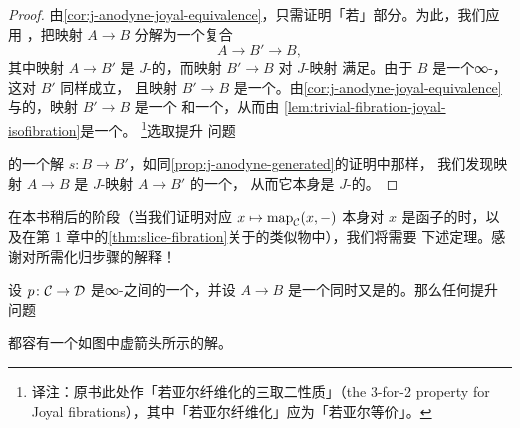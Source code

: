 \begin{proof}
由\cref{cor:j-anodyne-joyal-equivalence}，只需证明「若」部分。为此，我们应用%
\trSmallObjectArgument{}，把映射 $A \to B$ 分解为一个复合
\[
A \longrightarrow B' \longrightarrow B,
\]
其中映射 $A \to B'$ 是 $J$-\trAnodyne{}的，而映射 $B' \to B$ 对 $J$-\trAnodyne{}映射
满足\trRightLiftingProperty{}。由于 $B$ 是一个∞-\trCategory{}，这对 $B'$ 同样成立，
且映射 $B' \to B$ 是一个\trIsofibration{}。由\cref{cor:j-anodyne-joyal-equivalence}
与\trJoyalEquivalence{}的\trThreeForTwoProperty{}，映射 $B' \to B$ 是一个%
\trIsofibration{}和一个\trJoyalEquivalence{}，从而由%
\cref{lem:trivial-fibration-joyal-isofibration}是一个\trTrivialFibration{}。%
\footnote{译注：原书此处作「若亚尔纤维化的三取二性质」（the 3-for-2
property for Joyal fibrations），其中「若亚尔纤维化」应为「若亚尔等价」。}选取提升
问题
\begin{center}
\end{center}
的一个解 $s\colon B \to B'$，如同\cref{prop:j-anodyne-generated}的证明中那样，
我们发现映射 $A \to B$ 是 $J$-\trAnodyne{}映射 $A \to B'$ 的一个\trRetract{}，
从而它本身是 $J$-\trAnodyne{}的。
\end{proof}

在本书稍后的阶段（当我们证明对应 $x \mapsto \mathrm{map}_{\mathcal{C}}(x, -)$ 本身对 $x$
是函子的时，以及在第 1 章中的\cref{thm:slice-fibration}关于\trFatSlice{}的类似物中），我们将需要
下述定理。感谢\trNguyen{}对所需化归步骤的解释！

\begin{theorem}\label{thm:isofibration-lifting-joyal-equivalence}
设 $p\colon \mathcal{C} \to \mathcal{D}$ 是∞-\trCategories{}之间的一个\trIsofibration{}，并设
$A \to B$ 是一个同时又是\trJoyalEquivalence{}的\trMonomorphism{}。那么任何提升
问题
\begin{center}
\end{center}
都容有一个如图中虚箭头所示的解。
\end{theorem}


